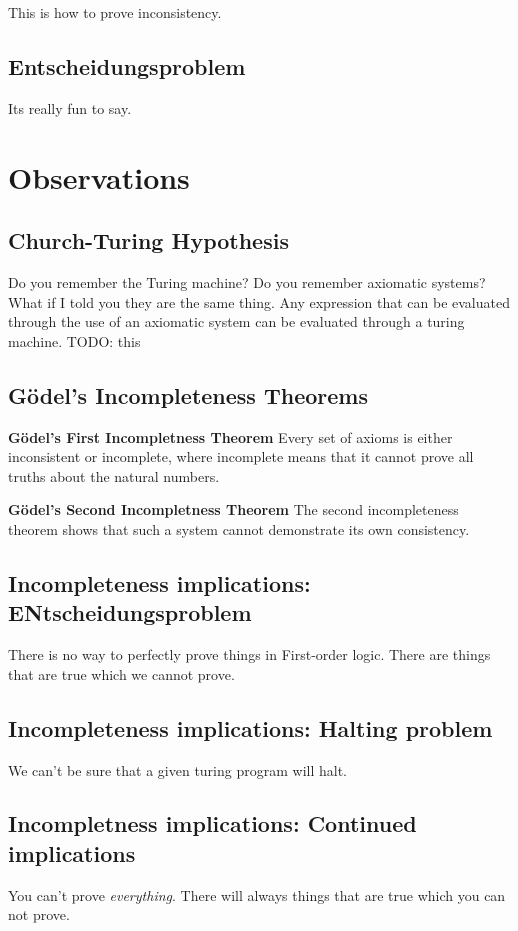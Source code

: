 \documentclass[11pt, letterpaper, twoside, openright]{book}
\begin{document}
This is how to prove inconsistency.

\subsection{Entscheidungsproblem}
Its really fun to say.

\section{Observations}
\subsection{Church-Turing Hypothesis}
Do you remember the Turing machine? Do you remember axiomatic systems? What if I told you they are the same thing. Any expression that can be evaluated through the use of an axiomatic system can be evaluated through a turing machine. TODO: this

\subsection{G\"{o}del's Incompleteness Theorems}
\textbf{G\"{o}del's First Incompletness Theorem} Every set of axioms is either inconsistent or incomplete, where incomplete means that it cannot prove all truths about the natural numbers.

\textbf{G\"{o}del's Second Incompletness Theorem} The second incompleteness theorem shows that such a system cannot demonstrate its own consistency.

\subsection{Incompleteness implications: ENtscheidungsproblem}
There is no way to perfectly prove things in First-order logic. There are things that are true which we cannot prove.

\subsection{Incompleteness implications: Halting problem}
We can't be sure that a given turing program will halt.

\subsection{Incompletness implications: Continued implications}
You can't prove \textit{everything}. There will always things that are true which you can not prove.
\end{document}

